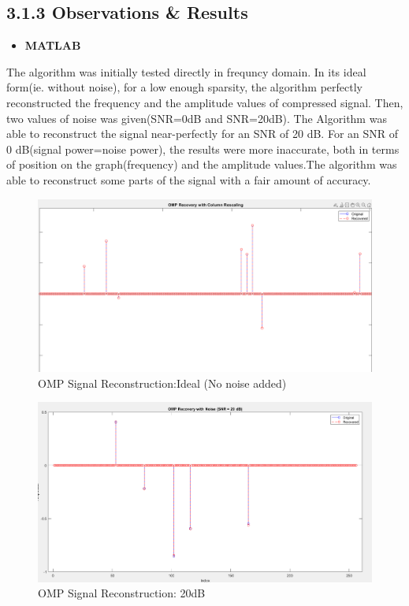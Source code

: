 \documentclass[
  letterpaper,
  DIV=11,
  numbers=noendperiod]{scrartcl}
\providecommand{\tightlist}{%
  \setlength{\itemsep}{0pt}\setlength{\parskip}{0pt}}
\begin{document}
\subsection{3.1.3 Observations \& Results}\label{observations-results}

\begin{itemize}
\tightlist
\item
  \textbf{MATLAB}
\end{itemize}

The algorithm was initially tested directly in frequncy domain. In its
ideal form(ie. without noise), for a low enough sparsity, the algorithm
perfectly reconstructed the frequency and the amplitude values of
compressed signal. Then, two values of noise was given(SNR=0dB and
SNR=20dB). The Algorithm was able to reconstruct the signal
near-perfectly for an SNR of 20 dB. For an SNR of 0 dB(signal
power=noise power), the results were more inaccurate, both in terms of
position on the graph(frequency) and the amplitude values.The algorithm
was able to reconstruct some parts of the signal with a fair amount of
accuracy.

\begin{figure}[H]

{\centering \includegraphics[width=0.8\linewidth,height=\textheight,keepaspectratio]{abar-cs_files/mediabag/omp_ideal_1.png}

}

\caption{OMP Signal Reconstruction:Ideal (No noise added)}

\end{figure}%

\begin{figure}[H]

{\centering \includegraphics[width=0.8\linewidth,height=\textheight,keepaspectratio]{abar-cs_files/mediabag/omp_noisy1.png}

}

\caption{OMP Signal Reconstruction: 20dB}

\end{figure}%
\end{document}
